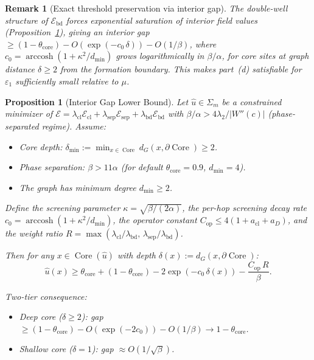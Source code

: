 \documentclass[lettersize,journal]{IEEEtran}
\newtheorem{proposition}[theorem]{Proposition}
\newtheorem{remark}{Remark}
\DeclareMathOperator{\Core}{Core}
\begin{document}
\begin{remark}[Exact threshold preservation via interior gap]
The double-well structure of $\mathcal{E}_{\mathrm{bd}}$ forces exponential saturation of interior field values (Proposition~\ref{prop:interior-gap}), giving an interior gap $\geq (1 - \theta_{\mathrm{core}}) - O(\exp(-c_0\,\delta)) - O(1/\beta)$, where $c_0 = \operatorname{arccosh}(1 + \kappa^2/d_{\min})$ grows logarithmically in $\beta/\alpha$, for core sites at graph distance $\delta \geq 2$ from the formation boundary. This makes part~(d) satisfiable for $\varepsilon_1$ sufficiently small relative to $\mu$.
\end{remark}

\begin{proposition}[Interior Gap Lower Bound]
\label{prop:interior-gap}
Let $\hat{u} \in \Sigma_m$ be a constrained minimizer of $\mathcal{E} = \lambda_{\mathrm{cl}}\mathcal{E}_{\mathrm{cl}} + \lambda_{\mathrm{sep}}\mathcal{E}_{\mathrm{sep}} + \lambda_{\mathrm{bd}}\mathcal{E}_{\mathrm{bd}}$ with $\beta/\alpha > 4\lambda_2/|W''(c)|$ (phase-separated regime). Assume:
\begin{itemize}
\item[\emph{(H2)}] \emph{Core depth:} $\delta_{\min} := \min_{x \in \Core} d_G(x, \partial\Core) \geq 2$.
\item[\emph{(H3)}] \emph{Phase separation:} $\beta > 11\alpha$ (for default $\theta_{\mathrm{core}} = 0.9$, $d_{\min} = 4$).
\item The graph has minimum degree $d_{\min} \geq 2$.
\end{itemize}
Define the screening parameter $\kappa = \sqrt{\beta/(2\alpha)}$, the per-hop screening decay rate $c_0 = \operatorname{arccosh}(1 + \kappa^2/d_{\min})$, the operator constant $C_{\mathrm{op}} \leq 4(1 + a_{\mathrm{cl}} + a_D)$, and the weight ratio $R = \max(\lambda_{\mathrm{cl}}/\lambda_{\mathrm{bd}},\, \lambda_{\mathrm{sep}}/\lambda_{\mathrm{bd}})$.

Then for any $x \in \Core(\hat{u})$ with depth $\delta(x) := d_G(x, \partial\Core)$:
\begin{equation}
\label{eq:interior-gap}
\hat{u}(x) \geq \theta_{\mathrm{core}} + (1 - \theta_{\mathrm{core}}) - 2\exp(-c_0\,\delta(x)) - \frac{C_{\mathrm{op}}\, R}{\beta}.
\end{equation}

\noindent\emph{Two-tier consequence:}
\begin{itemize}
\item \emph{Deep core} ($\delta \geq 2$): gap $\geq (1 - \theta_{\mathrm{core}}) - O(\exp(-2c_0)) - O(1/\beta) \to 1 - \theta_{\mathrm{core}}$.
\item \emph{Shallow core} ($\delta = 1$): gap $\approx O(1/\sqrt{\beta})$.
\end{itemize}
\end{proposition}
\end{document}
